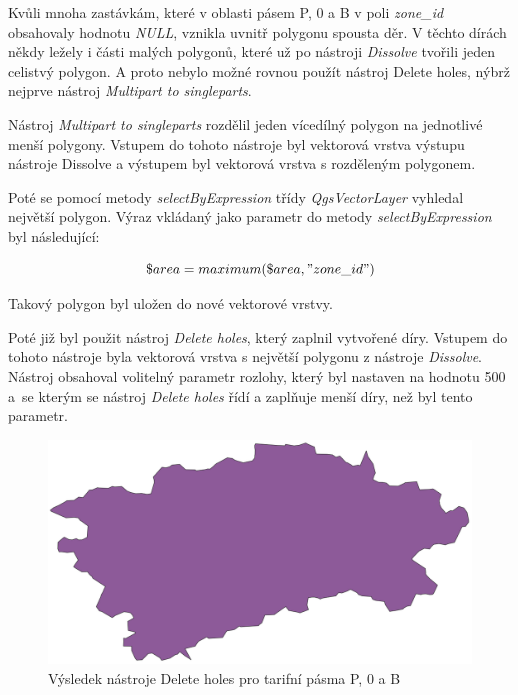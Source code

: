 Kvůli mnoha zastávkám, které v oblasti pásem P, 0 a B v poli \textit{zone\_id} obsahovaly hodnotu \textit{NULL},
vznikla uvnitř polygonu spousta děr. V těchto dírách někdy ležely i části malých polygonů, které 
už po nástroji \textit{Dissolve} tvořili jeden celistvý polygon. A proto nebylo možné rovnou použít nástroj Delete holes,
nýbrž nejprve nástroj \textit{Multipart to singleparts}.

Nástroj \textit{Multipart to singleparts} rozdělil jeden vícedílný polygon na jednotlivé menší polygony. Vstupem do tohoto
nástroje byl vektorová vrstva výstupu nástroje Dissolve a výstupem byl vektorová vrstva s rozděleným polygonem.

Poté se pomocí metody \textit{selectByExpression} třídy \textit{QgsVectorLayer} vyhledal nej\-větší polygon.
Výraz vkládaný jako parametr do metody \textit{selectByExpression} byl následující:

\[\$area = maximum(\$area, "zone\_id")\]

Takový polygon byl uložen do nové vektorové vrstvy. 

Poté již byl použit nástroj \textit{Delete holes}, který zaplnil vytvořené díry. Vstupem do tohoto nástroje byla vektorová
vrstva s největší polygonu z nástroje \textit{Dissolve}. Nástroj obsahoval volitelný parametr rozlohy, který byl
nastaven na hodnotu 500 a~se kterým se nástroj \textit{Delete holes} řídí a zaplňuje menší díry, než byl tento parametr.  

\begin{figure}[H] \centering
    \includegraphics[width=400pt]{./pictures/without-holes-P0B.png}
    \caption[Výsledek nástroje Delete holes pro tarifní pásma P, 0 a B]{Výsledek nástroje Delete holes pro tarifní pásma P, 0 a B}
	\label{fig:without-holes-P0B}              
\end{figure} 

